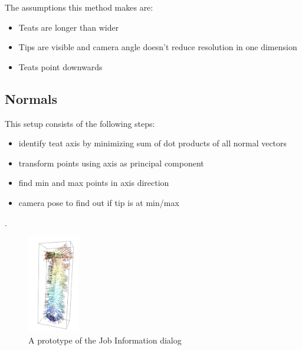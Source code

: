     The assumptions this method makes are:
    \begin{itemize}
        \item Teats are longer than wider
        \item Tips are visible and camera angle doesn't reduce resolution in one dimension
        \item Teats point downwards
    \end{itemize}
    \lipsum[2-3]
    
    \subsection{Normals}
    
    
    \lipsum[2-3]
    This setup consists of the following steps:
        \begin{itemize}
        \item identify teat axis by minimizing sum of dot products of all normal vectors
        \item transform points using axis as principal component
        \item find min and max points in axis direction
        \item  camera pose to find out if tip is at min/max
        \end{itemize}.
    
    \begin{figure}[!ht]
        \centering
        \includegraphics[width=0.2\textwidth]{images/cow_normals.png}
        \caption{A prototype of the Job Information dialog}
        \label{fig:cow_fmc}
    \end{figure}
    
